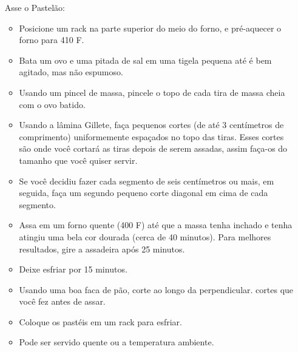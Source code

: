 \documentclass [11pt, letterpaper] {article}
\newcommand \fileName {Pastelao}
\begin{document}
\begin {description}
\begin{enumerate}
\item [Asse o Pastel\~ao:] \ \\
        \begin {itemize}
        \item Posicione um rack na parte superior do meio do forno,
        e pré-aquecer o forno para 410 F.
        \item Bata um ovo e uma pitada de sal em uma tigela pequena até
        é bem agitado, mas não espumoso.
        \item Usando um pincel de massa, pincele o topo de cada
        tira de massa cheia com o ovo batido.
        \item Usando a l\^amina Gillete, faça pequenos 
        cortes (de até 3 cent\'imetros de comprimento) uniformemente espaçados no topo das tiras. Esses cortes são
        onde você cortará as tiras depois de serem assadas, assim
        faça-os do tamanho que voc\^e quiser servir.
        \item Se você decidiu fazer cada segmento de seis cent\'imetros ou mais,
        em seguida, faça um segundo pequeno corte diagonal em cima de cada segmento.
        \item Assa em um forno quente (400 F) até que a massa tenha inchado e tenha
        atingiu uma bela cor dourada (cerca de 40 minutos). Para melhores resultados, gire a assadeira após 25 minutos.
        \item Deixe esfriar por 15 minutos.
        \item Usando uma boa faca de pão, corte ao longo da perpendicular.
        cortes que você fez antes de assar.
        \item Coloque os pastéis em um rack para esfriar.
        \item Pode ser servido quente ou a temperatura ambiente.
        \end {itemize}
\end {enumerate}
\end {description}


\end{document}
